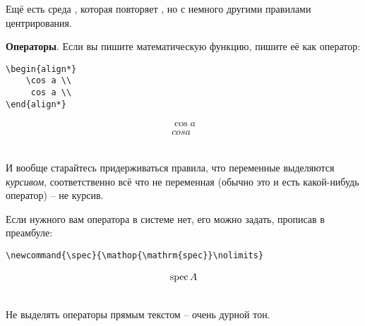 Ещё есть среда , которая повторяет , но с немного другими правилами центрирования. 




\textbf{Операторы}. Если вы пишите математическую функцию, пишите её как оператор: \\
\begin{minipage}{0.45\textwidth}
    \begin{lstlisting}
\begin{align*}
    \cos a \\
     cos a \\
\end{align*}
\end{lstlisting}
\end{minipage}
\hfill
\vline
\hfill
\begin{minipage}{0.45\textwidth}
    \begin{align*}
        \cos a \\
         cos a
    \end{align*}
\end{minipage}
\\И вообще старайтесь придерживаться правила, что переменные выделяются \textit{курсивом}, соответственно всё что не переменная (обычно это и есть какой-нибудь оператор) -- не курсив.

Если нужного вам оператора в системе нет, его можно задать, прописав в преамбуле: \\
\begin{minipage}{0.65\textwidth}
\begin{lstlisting}
\newcommand{\spec}{\mathop{\mathrm{spec}}\nolimits}
\end{lstlisting}
\end{minipage}
\hfill
\vline
\hfill
\begin{minipage}{0.25\textwidth}
    \begin{align*}
        \spec A
    \end{align*}
\end{minipage}
\\Не выделять операторы прямым текстом -- очень дурной тон. 


